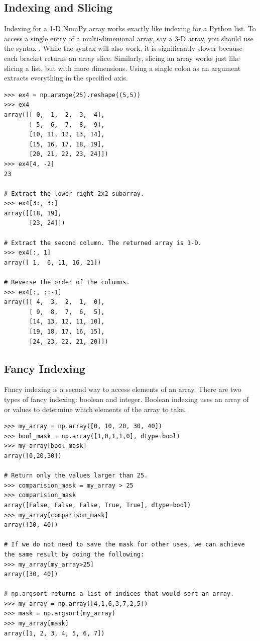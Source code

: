 \subsection*{Indexing and Slicing} 
Indexing for a 1-D NumPy array works exactly like indexing for a Python list. 
To access a single entry of a multi-dimenional array, say a 3-D array, you should use the syntax . 
While the syntax  will also work, it is significantly slower because each bracket returns an array slice. 
Similarly, slicing an array works just like slicing a list, but with more dimensions. Using a single colon as an argument extracts everything in the specified axis.
\begin{lstlisting}
>>> ex4 = np.arange(25).reshape((5,5)) 
>>> ex4
array([[ 0,  1,  2,  3,  4],
       [ 5,  6,  7,  8,  9],
       [10, 11, 12, 13, 14],
       [15, 16, 17, 18, 19],
       [20, 21, 22, 23, 24]])
>>> ex4[4, -2]
23

# Extract the lower right 2x2 subarray.
>>> ex4[3:, 3:] 
array([[18, 19],
       [23, 24]])
       
# Extract the second column. The returned array is 1-D.
>>> ex4[:, 1] 
array([ 1,  6, 11, 16, 21]) 

# Reverse the order of the columns.
>>> ex4[:, ::-1] 
array([[ 4,  3,  2,  1,  0],
       [ 9,  8,  7,  6,  5],
       [14, 13, 12, 11, 10],
       [19, 18, 17, 16, 15],
       [24, 23, 22, 21, 20]])
\end{lstlisting}

\subsection*{Fancy Indexing}
Fancy indexing is a second way to access elements of an array. 
There are two types of fancy indexing: boolean and integer. 
Boolean indexing uses an array of  or  values to 
determine which elements of the array to take. 

\begin{lstlisting}
>>> my_array = np.array([0, 10, 20, 30, 40])
>>> bool_mask = np.array([1,0,1,1,0], dtype=bool)
>>> my_array[bool_mask]
array([0,20,30])

# Return only the values larger than 25.
>>> comparision_mask = my_array > 25
>>> comparision_mask
array([False, False, False, True, True], dtype=bool)
>>> my_array[comparison_mask]
array([30, 40])

# If we do not need to save the mask for other uses, we can achieve the same result by doing the following:
>>> my_array[my_array>25]
array([30, 40])

# np.argsort returns a list of indices that would sort an array.
>>> my_array = np.array([4,1,6,3,7,2,5])
>>> mask = np.argsort(my_array)
>>> my_array[mask]
array([1, 2, 3, 4, 5, 6, 7])
\end{lstlisting}

